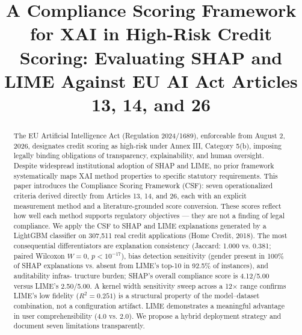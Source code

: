 \documentclass[conference]{IEEEtran}
\begin{document}
\title{ A Compliance Scoring Framework for XAI in High-Risk Credit Scoring: Evaluating SHAP and LIME Against EU AI Act Articles 13, 14, and 26}

\author{
\and
{}
\and
{}
}

\maketitle

\begin{abstract}
The EU Artificial Intelligence Act (Regulation 2024/1689), enforceable from August 2, 2026, designates credit scoring as high-risk under Annex III, Category 5(b), imposing legally binding obligations of transparency, explainability, and human oversight. Despite widespread institutional adoption of SHAP and LIME, no prior framework systematically maps XAI method properties to specific statutory requirements. This paper introduces the Compliance Scoring Framework (CSF): seven operationalized criteria derived directly from Articles 13, 14, and 26, each with an explicit measurement method and a literature-grounded score conversion. These scores reflect how well each method supports regulatory objectives — they are not a finding of legal compliance. We apply the CSF to SHAP and LIME explanations generated by a LightGBM classifier on 307,511 real credit applications (Home Credit, 2018). The most consequential differentiators are explanation consistency (Jaccard: 1.000 vs. 0.381; paired Wilcoxon $W=0$, $p<10^{-17}$), bias detection sensitivity (gender present in 100\% of SHAP explanations vs. absent from LIME's top-10 in 92.5\% of instances), and auditability infras- tructure burden; SHAP's overall compliance score is 4.12/5.00 versus LIME’s 2.50/5.00. A kernel width sensitivity sweep across a 12× range confirms LIME’s low fidelity ($R^2 = 0.251$) is a structural property of the model–dataset combination, not a configuration artifact. LIME demonstrates a meaningful advantage in user comprehensibility (4.0 vs. 2.0). We propose a hybrid deployment strategy and document seven limitations transparently.

\end{abstract}
\end{document}
